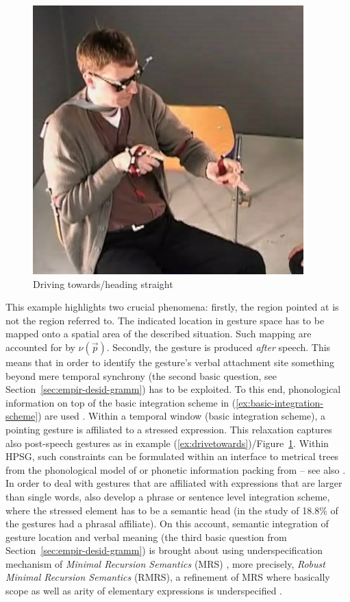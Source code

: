 \documentclass[output=paper]{langsci/langscibook}
\begin{document}
\begin{figure}[tb]
  \centering
  \includegraphics[width=0.5\linewidth]{figures/draufzu}
  \caption{Driving towards/heading straight}
  \label{fig:drivetowards}
\end{figure}

This example highlights two crucial phenomena: firstly, the region pointed at is not the region referred to. 
%
The indicated location in gesture space has to be mapped onto a spatial area of the described situation.
%
Such mapping are accounted for by $\nu(\vec{p})$.
%
Secondly, the gesture is produced \emph{after} speech. 
%
This means that in order to identify the gesture's verbal attachment site something beyond mere temporal synchrony (the second basic question, see Section~\ref{sec:empir-desid-gramm}) has to be exploited.
%
To this end, phonological information on top  of the basic integration scheme in (\ref{ex:basic-integration-scheme}) are used \citep{Alahverdzhieva:Lascarides:2011,Luecking:2013:a}.
%
Within a temporal window (basic integration scheme), a pointing gesture is affiliated to a stressed expression. 
%
This relaxation captures also post-speech gestures  as in example (\ref{ex:drivetowards})/Figure~\ref{fig:drivetowards}.
%
Within HPSG, such constraints can be formulated within an interface to metrical trees from the phonological model of \citet{Klein:2000} or phonetic information packing from \citet{Engdahl:Vallduvi:1996} -- see also . 
%
In order to deal with gestures that are affiliated with expressions that are larger than single words, \citet{Alahverdzhieva:Lascarides:2011} also develop a phrase or sentence level integration scheme, where the stressed element has to be a semantic head (in the study of \citet{Mehler:Luecking:2012:d} 18.8\% of the gestures had a phrasal affiliate).
%
On this account, semantic integration of gesture location and verbal meaning (the third basic question from Section~\ref{sec:empir-desid-gramm}) is brought about using underspecification mechanism of \emph{Minimal Recursion Semantics}  (MRS) \citep{Copestake:Flickinger:Pollard:Sag:2005}, more precisely, \emph{Robust Minimal Recursion Semantics}  (RMRS), a refinement of MRS where basically scope as well as arity of elementary expressions is underspecified \citep{Copestake:2007}.
\end{document}
